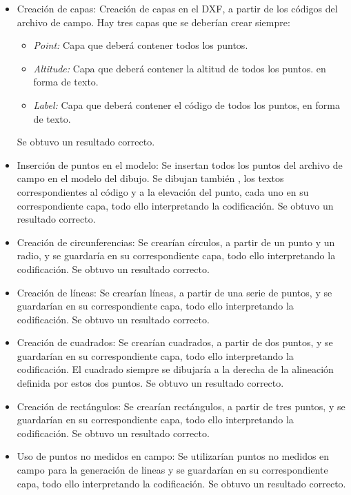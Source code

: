 \begin{itemize}
\item Creación de capas: Creación de capas en el DXF, a partir de los códigos del archivo de campo. Hay tres capas que se deberían crear siempre:
\begin{itemize}
	\item \emph{Point:} Capa que deberá contener todos los puntos.
 	\item \emph{Altitude:} Capa que deberá contener la altitud de todos los puntos. 	en forma de texto.
 	\item \emph{Label:}  Capa que deberá contener el código de todos los puntos, en 	forma de texto.
\end{itemize}
Se obtuvo un resultado correcto.

\item Inserción de puntos en el modelo: Se insertan todos los puntos del archivo de campo en el modelo del dibujo. Se dibujan también , los textos correspondientes al código y a la elevación del punto, cada uno en su correspondiente capa, todo ello interpretando la codificación. Se obtuvo un resultado correcto.

\item Creación de circunferencias: Se crearían círculos, a partir de un punto y un radio, y se guardaría en su correspondiente capa, todo ello interpretando la codificación. Se obtuvo un resultado correcto.  

\item Creación de líneas: Se crearían líneas, a partir de una serie de puntos, y se guardarían en su correspondiente capa, todo ello interpretando la codificación. Se obtuvo un resultado correcto. 

\item Creación de cuadrados: Se crearían cuadrados, a partir de dos puntos, y se guardarían en su correspondiente capa, todo ello interpretando la codificación. El cuadrado siempre se dibujaría a la derecha de la alineación definida por estos dos puntos. Se obtuvo un resultado correcto.   

\item Creación de rectángulos: Se crearían rectángulos, a partir de tres puntos, y se guardarían en su correspondiente capa, todo ello interpretando la codificación. Se obtuvo un resultado correcto.   

\item Uso de puntos no medidos en campo: Se utilizarían puntos no medidos en campo para la generación de lineas y se guardarían en su correspondiente capa, todo ello interpretando la codificación. Se obtuvo un resultado correcto.
\end{itemize}

